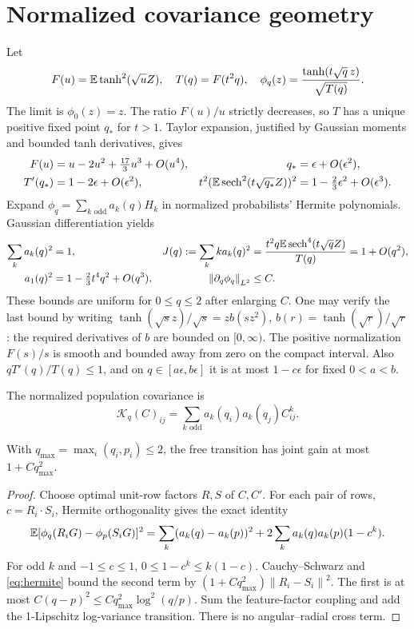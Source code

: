 \documentclass[11pt]{article}
\newcommand{\norm}[1]{\left\lVert#1\right\rVert}
\begin{document}
\section{Normalized covariance geometry}\label{sec:metric}
Let
\begin{equation}
 F(u)=\mathbb E\tanh^2(\sqrt u Z),\quad T(q)=F(t^2q),\quad
 \phi_q(z)=\frac{\tanh(t\sqrt q\,z)}{\sqrt{T(q)}}.
\end{equation}
The limit is $\phi_0(z)=z$. The ratio $F(u)/u$ strictly decreases, so $T$ has a unique positive fixed point $q_*$ for $t>1$. Taylor expansion, justified by Gaussian moments and bounded tanh derivatives, gives
\begin{align}
 F(u)&=u-2u^2+\tfrac{17}{3}u^3+O(u^4),&q_*&=\epsilon+O(\epsilon^2),\label{eq:expansions}\\
 T'(q_*)&=1-2\epsilon+O(\epsilon^2),&
 t^2(\mathbb E\operatorname{sech}^2(t\sqrt{q_*}Z))^2&=1-\tfrac23\epsilon^2+O(\epsilon^3).\nonumber
\end{align}
Expand $\phi_q=\sum_{k\text{ odd}}a_k(q)H_k$ in normalized probabilists' Hermite polynomials. Gaussian differentiation yields
\begin{align}
 \sum_k a_k(q)^2&=1,&
 J(q):=\sum_k k a_k(q)^2&=\frac{t^2q\E\sech^4(t\sqrt q Z)}{T(q)}=1+O(q^2),\label{eq:hermite}\\
 a_1(q)^2&=1-\tfrac23t^4q^2+O(q^3),&
 \norm{\partial_q\phi_q}_{L^2}&\le C.\nonumber
\end{align}
These bounds are uniform for $0\le q\le2$ after enlarging $C$. One may verify the last bound by writing $\tanh(\sqrt s z)/\sqrt s=z b(sz^2)$, $b(r)=\tanh(\sqrt r)/\sqrt r$: the required derivatives of $b$ are bounded on $[0,\infty)$. The positive normalization $F(s)/s$ is smooth and bounded away from zero on the compact interval. Also $qT'(q)/T(q)\le1$, and on $q\in[a\epsilon,b\epsilon]$ it is at most $1-c\epsilon$ for fixed $0<a<b$.

The normalized population covariance is
\begin{equation}\label{eq:kernel}
 \mathcal K_q(C)_{ij}=\sum_{k\text{ odd}}a_k(q_i)a_k(q_j)C_{ij}^{k}.
\end{equation}
\begin{lemma}\label{lem:global}
With $q_{\max}=\max_i(q_i,p_i)\le2$, the free transition has joint gain at most $1+Cq_{\max}^2$.
\end{lemma}
\begin{proof}
Choose optimal unit-row factors $R,S$ of $C,C'$. For each pair of rows, $c=R_i\cdot S_i$, Hermite orthogonality gives the exact identity
\begin{equation}\label{eq:rowidentity}
 \mathbb E[\phi_q(R_iG)-\phi_p(S_iG)]^2
 =\sum_k(a_k(q)-a_k(p))^2+2\sum_k a_k(q)a_k(p)(1-c^k).
\end{equation}
For odd $k$ and $-1\le c\le1$, $0\le1-c^k\le k(1-c)$. Cauchy--Schwarz and \eqref{eq:hermite} bound the second term by $(1+Cq_{\max}^2)\norm{R_i-S_i}^2$. The first is at most $C(q-p)^2\le Cq_{\max}^2\log^2(q/p)$. Sum the feature-factor coupling and add the 1-Lipschitz log-variance transition. There is no angular--radial cross term.
\end{proof}
\end{document}
